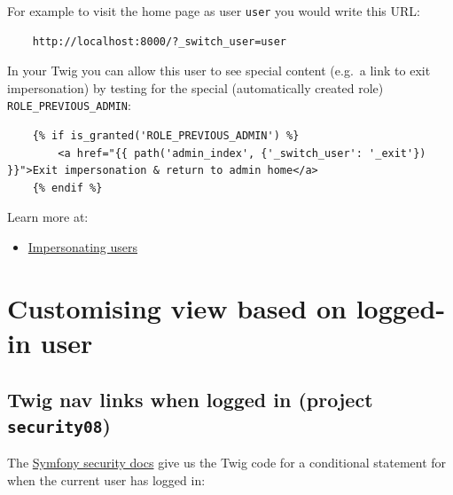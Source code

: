\documentclass[a4paperpaper,openright]{book}
\newenvironment{Shaded}{}{}
\newcommand{\KeywordTok}[1]{\textcolor[rgb]{0.00,0.44,0.13}{\textbf{#1}}}
\newcommand{\NormalTok}[1]{#1}
\providecommand{\tightlist}{%
  \setlength{\itemsep}{0pt}\setlength{\parskip}{0pt}}
\begin{document}
For example to visit the home page as user \texttt{user} you would write
this URL:

\begin{verbatim}
    http://localhost:8000/?_switch_user=user
\end{verbatim}

In your Twig you can allow this user to see special content (e.g.~a link
to exit impersonation) by testing for the special (automatically created
role) \texttt{ROLE\_PREVIOUS\_ADMIN}:

\begin{verbatim}
    {% if is_granted('ROLE_PREVIOUS_ADMIN') %}
        <a href="{{ path('admin_index', {'_switch_user': '_exit'}) }}">Exit impersonation & return to admin home</a>
    {% endif %}
\end{verbatim}

Learn more at:

\begin{itemize}
\tightlist
\item
  \href{https://symfony.com/doc/current/security/impersonating_user.html}{Impersonating
  users}
\end{itemize}

\hypertarget{customising-view-based-on-logged-in-user}{%
\chapter{Customising view based on logged-in
user}\label{customising-view-based-on-logged-in-user}}

\hypertarget{twig-nav-links-when-logged-in-project-security08}{%
\section{\texorpdfstring{Twig nav links when logged in (project
\texttt{security08})}{Twig nav links when logged in (project security08)}}\label{twig-nav-links-when-logged-in-project-security08}}

The
\href{https://symfony.com/doc/current/security.html\#fetch-the-user-in-a-template}{Symfony
security docs} give us the Twig code for a conditional statement for
when the current user has logged in:

\begin{Shaded}
\end{Shaded}
\end{document}
